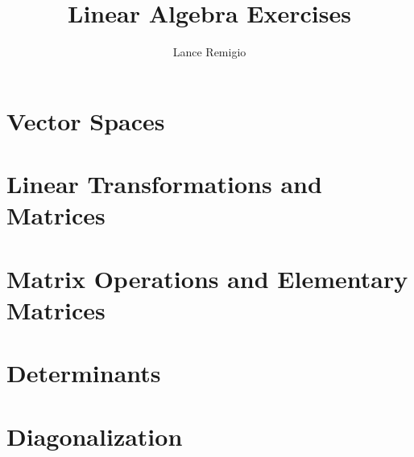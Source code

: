 \documentclass[11pt, a4paper]{book}
\title{Linear Algebra Exercises}
\author{Lance Remigio}
\begin{document}
\tableofcontents
\maketitle 

\chapter{Vector Spaces}











\chapter{Linear Transformations and Matrices}











\chapter{Matrix Operations and Elementary Matrices}



\chapter{Determinants}





\chapter{Diagonalization}


\end{document}
